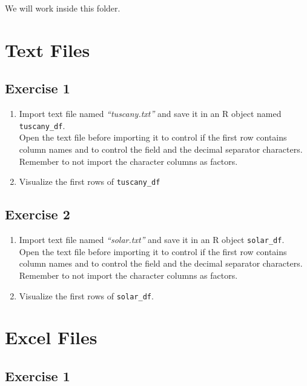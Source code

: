 \documentclass[]{book}
\begin{document}
We will work inside this folder.

\section{Text Files}\label{text-files}

\subsection{Exercise 1}\label{exercise-1-5}

\begin{enumerate}
\def\labelenumi{\alph{enumi}.}
\item
  Import text file named \emph{``tuscany.txt''} and save it in an R
  object named \texttt{tuscany\_df}.\\
  Open the text file before importing it to control if the first row
  contains column names and to control the field and the decimal
  separator characters. Remember to not import the character columns as
  factors.
\item
  Visualize the first rows of \texttt{tuscany\_df}
\end{enumerate}

\subsection{Exercise 2}\label{exercise-2-2}

\begin{enumerate}
\def\labelenumi{\alph{enumi}.}
\item
  Import text file named \emph{``solar.txt''} and save it in an R object
  \texttt{solar\_df}.\\
  Open the text file before importing it to control if the first row
  contains column names and to control the field and the decimal
  separator characters. Remember to not import the character columns as
  factors.
\item
  Visualize the first rows of \texttt{solar\_df}.
\end{enumerate}

\section{Excel Files}\label{excel-files}

\subsection{Exercise 1}\label{exercise-1-6}
\end{document}
